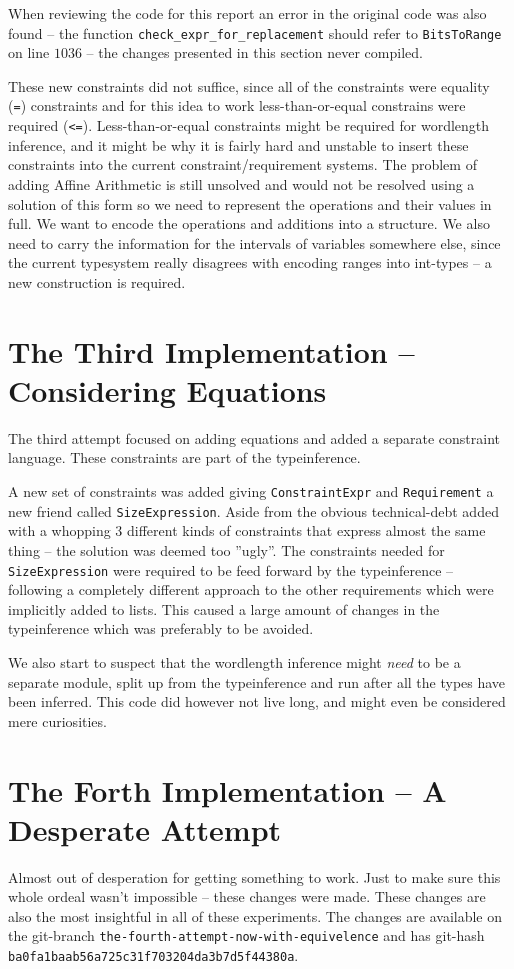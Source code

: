 When reviewing the code for this report an error in the original code was also found -- the function \verb+check_expr_for_replacement+ should refer to \verb+BitsToRange+ on line $1036$ -- the changes presented in this section never compiled.

These new constraints did not suffice, since all of the constraints were equality (\verb+=+) constraints and for this idea to work less-than-or-equal constrains were required (\verb+<=+). Less-than-or-equal constraints might be required for wordlength inference, and it might be why it is fairly hard and unstable to insert these constraints into the current constraint/requirement systems. The problem of adding Affine Arithmetic is still unsolved and would not be resolved using a solution of this form so we need to represent the operations and their values in full. We want to encode the operations and additions into a structure. We also need to carry the information for the intervals of variables somewhere else, since the current typesystem really disagrees with encoding ranges into int-types -- a new construction is required. 

\section{The Third Implementation -- Considering Equations}
\label{sec:Third}
The third attempt focused on adding equations and added a separate constraint language. These constraints are part of the typeinference.

A new set of constraints was added giving \verb+ConstraintExpr+ and \verb+Requirement+ a new friend called \verb+SizeExpression+. Aside from the obvious technical-debt added with a whopping 3 different kinds of constraints that express almost the same thing -- the solution was deemed too ''ugly''. The constraints needed for \verb+SizeExpression+ were required to be feed forward by the typeinference -- following a completely different approach to the other requirements which were implicitly added to lists. This caused a large amount of changes in the typeinference which was preferably to be avoided.

We also start to suspect that the wordlength inference might \textit{need} to be a separate module, split up from the typeinference and run after all the types have been inferred. This code did however not live long, and might even be considered mere curiosities.

\section{The Forth Implementation -- A Desperate Attempt}
Almost out of desperation for getting something to work. Just to make sure this whole ordeal wasn't impossible -- these changes were made. These changes are also the most insightful in all of these experiments. The changes are available on the git-branch \verb+the-fourth-attempt-now-with-equivelence+ and has git-hash \verb+ba0fa1baab56a725c31f703204da3b7d5f44380a+.

